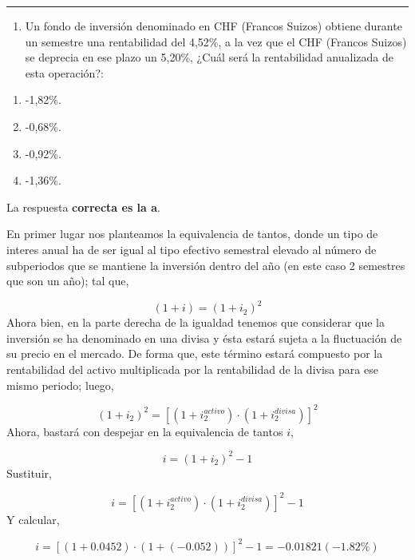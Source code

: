 \documentclass[
  letterpaper,
  DIV=11,
  numbers=noendperiod]{scrreprt}
\providecommand{\tightlist}{%
  \setlength{\itemsep}{0pt}\setlength{\parskip}{0pt}}\usepackage{longtable,booktabs,array}
\begin{document}
\begin{center}\rule{0.5\linewidth}{0.5pt}\end{center}

\begin{enumerate}
\def\labelenumi{\arabic{enumi}.}
\setcounter{enumi}{42}
\tightlist
\item
  Un fondo de inversión denominado en CHF (Francos Suizos) obtiene
  durante un semestre una rentabilidad del 4,52\%, a la vez que el CHF
  (Francos Suizos) se deprecia en ese plazo un 5,20\%, ¿Cuál será la
  rentabilidad anualizada de esta operación?:
\end{enumerate}

\begin{enumerate}
\def\labelenumi{\alph{enumi})}
\item
  -1,82\%.
\item
  -0,68\%.
\item
  -0,92\%.
\item
  -1,36\%.
\end{enumerate}

\begin{tcolorbox}[enhanced jigsaw, left=2mm, opacityback=0, colback=white, breakable, arc=.35mm, bottomrule=.15mm, rightrule=.15mm, toprule=.15mm, leftrule=.75mm, colframe=quarto-callout-tip-color-frame]
\begin{minipage}[t]{5.5mm}
\textcolor{quarto-callout-tip-color}{\faLightbulb}
\end{minipage}%
\begin{minipage}[t]{\textwidth - 5.5mm}

La respuesta \textbf{correcta es la a}.

En primer lugar nos planteamos la equivalencia de tantos, donde un tipo
de interes anual ha de ser igual al tipo efectivo semestral elevado al
número de subperiodos que se mantiene la inversión dentro del año (en
este caso 2 semestres que son un año); tal que,

\[(1+i)=(1+i_2)^2\] Ahora bien, en la parte derecha de la igualdad
tenemos que considerar que la inversión se ha denominado en una divisa y
ésta estará sujeta a la fluctuación de su precio en el mercado. De forma
que, este término estará compuesto por la rentabilidad del activo
multiplicada por la rentabilidad de la divisa para ese mismo periodo;
luego,

\[(1+i_2)^2=[(1+i_2^{activo})\cdot(1+i_2^{divisa})]^2\] Ahora, bastará
con despejar en la equivalencia de tantos \(i\),

\[i=(1+i_2)^2-1\] Sustituir,

\[i=[(1+i_2^{activo})\cdot(1+i_2^{divisa})]^2-1\] Y calcular,

\[i=[(1+0.0452)\cdot(1+(-0.052))]^2-1=-0.01821(-1.82\%)\]

\end{minipage}%
\end{tcolorbox}
\end{document}
